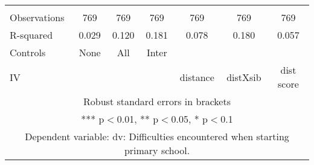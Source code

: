 \begin{tabular}{lcccccc}
 &  &  &  &  &  &  \\
Observations & 769 & 769 & 769 & 769 & 769 & 769 \\
R-squared & 0.029 & 0.120 & 0.181 & 0.078 & 0.180 & 0.057 \\
Controls & None & All & Inter &  &  &  \\
 IV &  &  &  & distance & distXsib & dist score \\ \hline
\multicolumn{7}{c}{ Robust standard errors in brackets} \\
\multicolumn{7}{c}{ *** p$<$0.01, ** p$<$0.05, * p$<$0.1} \\
\multicolumn{7}{c}{ Dependent variable: dv: Difficulties encountered when starting primary school.} \\
\end{tabular}
